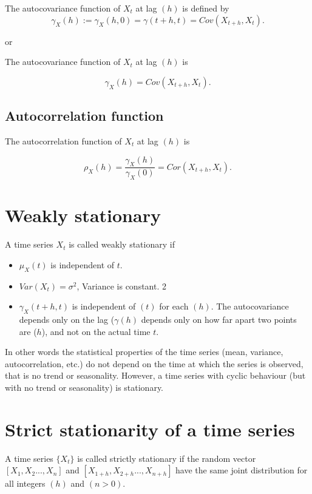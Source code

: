 \documentclass[
  11pt,
  a4paper,
]{report}
\begin{document}
The autocovariance function of \({X_t}\) at lag \((h)\) is defined by
\[\gamma_X(h):=\gamma_X(h, 0)=\gamma(t+h, t)=Cov(X_{t+h}, X_t).\]

or

The autocovariance function of \({X_t}\) at lag \((h)\) is

\[\gamma_X(h)=Cov(X_{t+h}, X_t).\]

\subsection{Autocorrelation function}\label{autocorrelation-function}

The autocorrelation function of \({X_t}\) at lag \((h)\) is

\[\rho_X(h)=\frac{\gamma_X(h)}{\gamma_X(0)}=Cor(X_{t+h}, X_t).\]

\section{Weakly stationary}\label{weakly-stationary}

A time series \({X_t}\) is called weakly stationary if

\begin{itemize}
\item
  \(\mu_X(t)\) is independent of \(t\).
\item
  \(Var(X_t) = \sigma^2\), Variance is constant. 2
\item
  \(\gamma_X(t+h, t)\) is independent of \((t)\) for each \((h)\). The
  autocovariance depends only on the lag (\(\gamma(h)\) depends only on
  how far apart two points are (\(h\)), and not on the actual time
  \(t\).
\end{itemize}

In other words the statistical properties of the time series (mean,
variance, autocorrelation, etc.) do not depend on the time at which the
series is observed, that is no trend or seasonality. However, a time
series with cyclic behaviour (but with no trend or seasonality) is
stationary.

\section{Strict stationarity of a time
series}\label{strict-stationarity-of-a-time-series}

A time series \(\{X_t\}\) is called strictly stationary if the random
vector \([X_1, X_2..., X_n]\) and \([X_{1+h}, X_{2+h}..., X_{n+h}]\)
have the same joint distribution for all integers \((h)\) and
\((n > 0)\).
\end{document}
